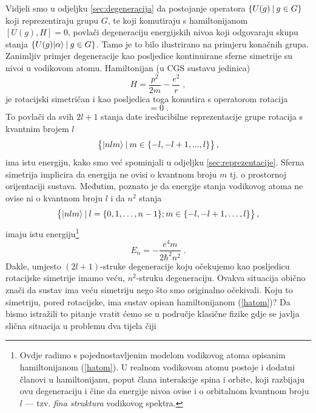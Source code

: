 Vidjeli smo u odjeljku \ref{sec:degeneracija} da postojanje operatora
$\{U(g) \: | \: g\in G \}$ koji reprezentiraju grupu $G$, te koji
komutiraju s hamiltonijanom $[U(g), H] = 0$, povlači degeneraciju
energijskih nivoa koji odgovaraju skupu stanja $\{U(g)| \alpha \rangle \: | \: g\in
G \}$. Tamo je to bilo ilustrirano na primjeru konačnih grupa. Zanimljiv
primjer degeneracije kao posljedice kontinuirane sferne simetrije su
nivoi u vodikovom atomu. Hamiltonijan (u CGS sustavu jedinica)
\begin{equation}
    H = \frac{p^2}{2m} - \frac{e^2}{r} \;,
\label{hatom}
\end{equation}
je rotacijski simetričan i kao posljedica toga komutira s operatorom
rotacija
\begin{equation}
     [H, D(R)] = 0 \;.
\end{equation}
To povlači da svih $2l+1$ stanja date ireducibilne reprezentacije
grupe rotacija s kvantnim brojem $l$
\begin{equation}
   \big\{| nlm \rangle \: | \: m\in\{-l, -l+1, ..., l \}\big\} \,,
\end{equation}
ima istu energiju, kako smo već spominjali u odjeljku \ref{sec:reprezentacije}.
Sferna simetrija implicira da energija ne ovisi o kvantnom broju $m$
tj. o prostornoj orijentaciji sustava.
Međutim, poznato je da energije stanja vodikovog atoma ne
ovise ni o kvantnom broju $l$ i da $n^2$ stanja
\begin{equation}
\big\{| nlm \rangle \: | \: l=\{0, 1, \ldots, n-1\}; m\in\{-l, -l+1, \ldots, l \}\big\}  \,,
\end{equation}
imaju istu energiju\footnote{Ovdje radimo s pojednostavljenim modelom vodikovog atoma
opisanim hamiltonijanom (\protect\ref{hatom}). U realnom vodikovom atomu
postoje i dodatni članovi u hamiltonijanu, poput člana interakcije spina
i orbite, koji razbijaju ovu degeneraciju i čine da energije nivoa ovise
i o orbitalnom kvantnom broju $l$ --- tzv. \emph{fina struktura} vodikovog
spektra.}
\begin{equation}
    E_n = - \frac{e^4 m}{2 \hbar^2 n^2}  \;.
\end{equation}
Dakle, umjesto $(2l+1)$-struke degeneracije koju očekujemo kao posljedicu
rotacijske simetrije imamo veću, $n^2$-struku degeneraciju. Ovakva
situacija obično znači da sustav ima veću simetriju nego što smo
originalno očekivali. Koju to simetriju, pored rotacijske, ima
sustav opisan hamiltonijanom (\ref{hatom})?
Da bismo istražili to pitanje vratit ćemo se u područje klasične
fizike gdje se javlja slična situacija u problemu dva tijela čiji
